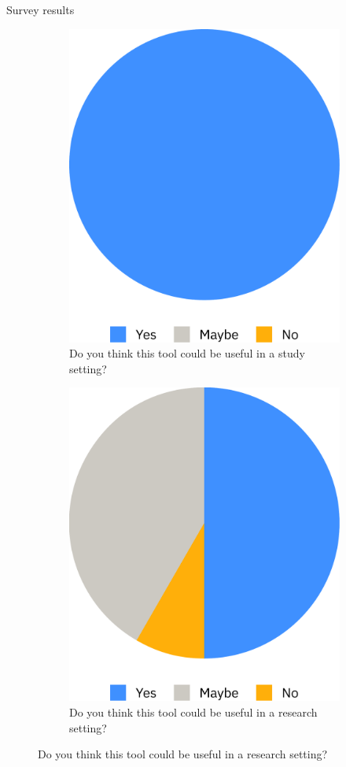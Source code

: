 \documentclass[aspectratio=169]{beamer}
\begin{document}
\begin{frame}[c]{Survey results}
    \begin{figure}
        \begin{subfigure}{.4\paperwidth}
            \centering
            \includegraphics[width=.7\linewidth]{images/survey-study.pdf}
            \bigskip
            \caption*{\centering Do you think this tool could be useful in a study setting?}
        \end{subfigure}
        \hfill
        \begin{subfigure}{.4\paperwidth}
            \centering
            \includegraphics[width=.7\linewidth]{images/survey-research.pdf}
            \bigskip
            \caption*{\centering Do you think this tool could be useful in a research setting?}
        \end{subfigure}
    \end{figure}
\end{frame}
\end{document}
